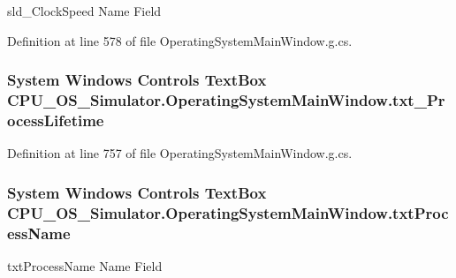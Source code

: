 sld\+\_\+\+Clock\+Speed Name Field 



Definition at line 578 of file Operating\+System\+Main\+Window.\+g.\+cs.

\hypertarget{class_c_p_u___o_s___simulator_1_1_operating_system_main_window_acc33a47fbe7956196846504306f7489e}{}
\subsubsection[{txt\+\_\+\+Process\+Lifetime}]{\setlength{\rightskip}{0pt plus 5cm}System Windows Controls Text\+Box C\+P\+U\+\_\+\+O\+S\+\_\+\+Simulator.\+Operating\+System\+Main\+Window.\+txt\+\_\+\+Process\+Lifetime\hspace{0.3cm}{\ttfamily [package]}}\label{class_c_p_u___o_s___simulator_1_1_operating_system_main_window_acc33a47fbe7956196846504306f7489e}


Definition at line 757 of file Operating\+System\+Main\+Window.\+g.\+cs.

\hypertarget{class_c_p_u___o_s___simulator_1_1_operating_system_main_window_a34784f7f4ffefd1dfa3e98c3bd03c260}{}
\subsubsection[{txt\+Process\+Name}]{\setlength{\rightskip}{0pt plus 5cm}System Windows Controls Text\+Box C\+P\+U\+\_\+\+O\+S\+\_\+\+Simulator.\+Operating\+System\+Main\+Window.\+txt\+Process\+Name}\label{class_c_p_u___o_s___simulator_1_1_operating_system_main_window_a34784f7f4ffefd1dfa3e98c3bd03c260}


txt\+Process\+Name Name Field 



